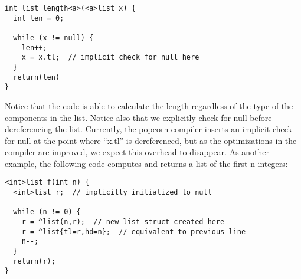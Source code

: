 \documentclass[titlepage,10pt]{article}
\begin{document}

\begin{verbatim}
int list_length<a>(<a>list x) {
  int len = 0;

  while (x != null) {
    len++;
    x = x.tl;  // implicit check for null here
  }
  return(len)
}
\end{verbatim}

Notice that the code is able to calculate the length regardless of the
type of the components in the list.  Notice also that we explicitly
check for null before dereferencing the list.  Currently, the popcorn
compiler inserts an implicit check for null at the point where ``x.tl''
is dereferenced, but as the optimizations in the compiler are improved,
we expect this overhead to disappear.  As another example, the following
code computes and returns a list of the first n integers:


\begin{verbatim}
<int>list f(int n) {
  <int>list r;  // implicitly initialized to null

  while (n != 0) {
    r = ^list(n,r);  // new list struct created here
    r = ^list{tl=r,hd=n};  // equivalent to previous line
    n--;
  }
  return(r);
}
\end{verbatim}
\end{document}
